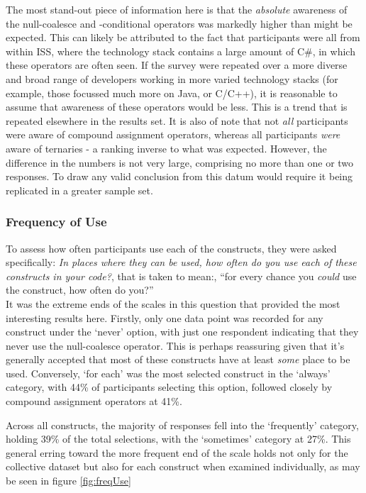\documentclass{article}
\begin{document}
            The most stand-out piece of information here is that the \emph{absolute} awareness of the null-coalesce and -conditional operators was markedly higher than might be expected. This can likely be attributed to the fact that participants were all from within ISS, where the  technology stack contains a large amount of C\#, in which these operators are often seen. If the survey were repeated over a more diverse and broad range of developers working in more varied technology stacks (for example, those focussed much more on Java, or C/C++), it is reasonable to assume that awareness of these operators would be less. This is a trend that is repeated elsewhere in the results set.
            It is also of note that not \emph{all} participants were aware of compound assignment operators, whereas all participants \emph{were} aware of ternaries - a ranking inverse to what was expected. However, the difference in the numbers is not very large, comprising no more than one or two responses. To draw any valid conclusion from this datum would require it being replicated in a greater sample set.
        \subsubsection{Frequency of Use}
            To assess how often participants use each of the constructs, they were asked specifically: \textit{In places where they can be used, how often do you use each of these constructs in your code?}, that is taken to mean:, ``for every chance you \emph{could} use the construct, how often do you?''
            \\\newline
            It was the extreme ends of the scales in this question that provided the most interesting results here. Firstly, only one data point was recorded for any construct under the `never' option, with just one respondent indicating that they never use the null-coalesce operator. This is perhaps reassuring given that it's generally accepted that most of these constructs have at least \emph{some} place to be used. Conversely, `for each' was the most selected construct in the `always' category, with 44\% of participants selecting this option, followed closely by compound assignment operators at 41\%.

            Across all constructs, the majority of responses fell into the `frequently' category, holding 39\% of the total selections, with the `sometimes' category at 27\%. This general erring toward the more frequent end of the scale holds not only for the collective dataset but also for each construct when examined individually, as may be seen in figure \ref{fig:freqUse}
\end{document}
